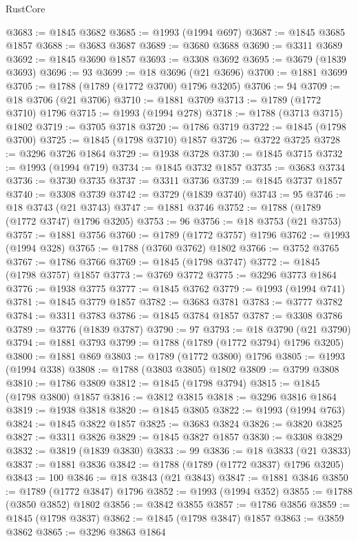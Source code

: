 \begin{lexlean}{RustCore}
\begin{coremodule}
@3683 := @1845 @3682
@3685 := @1993 (@1994 @697)
@3687 := @1845 @3685 @1857
@3688 := @3683 @3687
@3689 := @3680 @3688
@3690 := @3311 @3689
@3692 := @1845 @3690 @1857
@3693 := @3308 @3692
@3695 := @3679 (@1839 @3693)
@3696 := 93
@3699 := @18 @3696 (@21 @3696)
@3700 := @1881 @3699
@3705 := @1788 (@1789 (@1772 @3700) @1796 @3205)
@3706 := 94
@3709 := @18 @3706 (@21 @3706)
@3710 := @1881 @3709
@3713 := @1789 (@1772 @3710) @1796
@3715 := @1993 (@1994 @278)
@3718 := @1788 (@3713 @3715) @1802
@3719 := @3705 @3718
@3720 := @1786 @3719
@3722 := @1845 (@1798 @3700)
@3725 := @1845 (@1798 @3710) @1857
@3726 := @3722 @3725
@3728 := @3296 @3726 @1864
@3729 := @1938 @3728
@3730 := @1845 @3715
@3732 := @1993 (@1994 @719)
@3734 := @1845 @3732 @1857
@3735 := @3683 @3734
@3736 := @3730 @3735
@3737 := @3311 @3736
@3739 := @1845 @3737 @1857
@3740 := @3308 @3739
@3742 := @3729 (@1839 @3740)
@3743 := 95
@3746 := @18 @3743 (@21 @3743)
@3747 := @1881 @3746
@3752 := @1788 (@1789 (@1772 @3747) @1796 @3205)
@3753 := 96
@3756 := @18 @3753 (@21 @3753)
@3757 := @1881 @3756
@3760 := @1789 (@1772 @3757) @1796
@3762 := @1993 (@1994 @328)
@3765 := @1788 (@3760 @3762) @1802
@3766 := @3752 @3765
@3767 := @1786 @3766
@3769 := @1845 (@1798 @3747)
@3772 := @1845 (@1798 @3757) @1857
@3773 := @3769 @3772
@3775 := @3296 @3773 @1864
@3776 := @1938 @3775
@3777 := @1845 @3762
@3779 := @1993 (@1994 @741)
@3781 := @1845 @3779 @1857
@3782 := @3683 @3781
@3783 := @3777 @3782
@3784 := @3311 @3783
@3786 := @1845 @3784 @1857
@3787 := @3308 @3786
@3789 := @3776 (@1839 @3787)
@3790 := 97
@3793 := @18 @3790 (@21 @3790)
@3794 := @1881 @3793
@3799 := @1788 (@1789 (@1772 @3794) @1796 @3205)
@3800 := @1881 @869
@3803 := @1789 (@1772 @3800) @1796
@3805 := @1993 (@1994 @338)
@3808 := @1788 (@3803 @3805) @1802
@3809 := @3799 @3808
@3810 := @1786 @3809
@3812 := @1845 (@1798 @3794)
@3815 := @1845 (@1798 @3800) @1857
@3816 := @3812 @3815
@3818 := @3296 @3816 @1864
@3819 := @1938 @3818
@3820 := @1845 @3805
@3822 := @1993 (@1994 @763)
@3824 := @1845 @3822 @1857
@3825 := @3683 @3824
@3826 := @3820 @3825
@3827 := @3311 @3826
@3829 := @1845 @3827 @1857
@3830 := @3308 @3829
@3832 := @3819 (@1839 @3830)
@3833 := 99
@3836 := @18 @3833 (@21 @3833)
@3837 := @1881 @3836
@3842 := @1788 (@1789 (@1772 @3837) @1796 @3205)
@3843 := 100
@3846 := @18 @3843 (@21 @3843)
@3847 := @1881 @3846
@3850 := @1789 (@1772 @3847) @1796
@3852 := @1993 (@1994 @352)
@3855 := @1788 (@3850 @3852) @1802
@3856 := @3842 @3855
@3857 := @1786 @3856
@3859 := @1845 (@1798 @3837)
@3862 := @1845 (@1798 @3847) @1857
@3863 := @3859 @3862
@3865 := @3296 @3863 @1864

\end{coremodule}
\end{lexlean}

